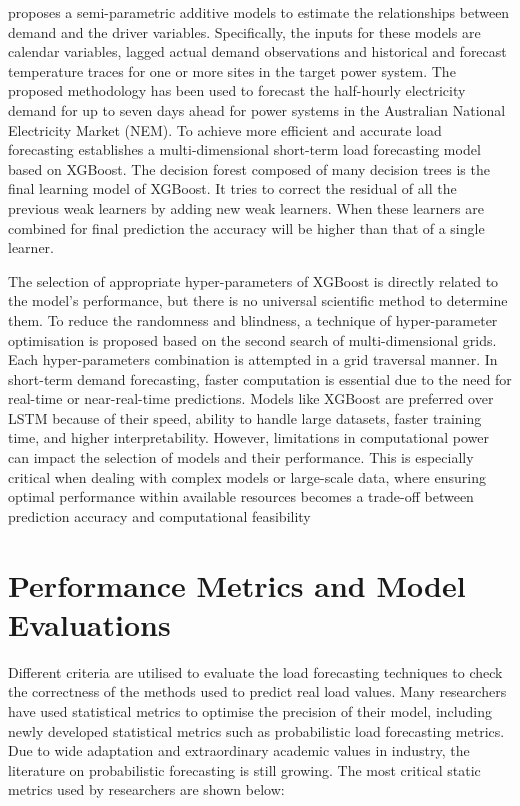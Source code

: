 \documentclass[mstat,12pt]{unswthesis}
\begin{document}
\cite{Fan2012} proposes a semi-parametric additive models to estimate
the relationships between demand and the driver variables. Specifically,
the inputs for these models are calendar variables, lagged actual demand
observations and historical and forecast temperature traces for one or
more sites in the target power system. The proposed methodology has been
used to forecast the half-hourly electricity demand for up to seven days
ahead for power systems in the Australian National Electricity Market
(NEM). To achieve more efficient and accurate load forecasting
\cite{Suo} establishes a multi-dimensional short-term load forecasting
model based on XGBoost. The decision forest composed of many decision
trees is the final learning model of XGBoost. It tries to correct the
residual of all the previous weak learners by adding new weak learners.
When these learners are combined for final prediction the accuracy will
be higher than that of a single learner.

The selection of appropriate hyper-parameters of XGBoost is directly
related to the model's performance, but there is no universal scientific
method to determine them. To reduce the randomness and blindness, a
technique of hyper-parameter optimisation is proposed based on the
second search of multi-dimensional grids. Each hyper-parameters
combination is attempted in a grid traversal manner. In short-term
demand forecasting, faster computation is essential due to the need for
real-time or near-real-time predictions. Models like XGBoost are
preferred over LSTM because of their speed, ability to handle large
datasets, faster training time, and higher interpretability. However,
limitations in computational power can impact the selection of models
and their performance. This is especially critical when dealing with
complex models or large-scale data, where ensuring optimal performance
within available resources becomes a trade-off between prediction
accuracy and computational feasibility

\hypertarget{performance-metrics-and-model-evaluations}{%
\section{Performance Metrics and Model
Evaluations}\label{performance-metrics-and-model-evaluations}}

Different criteria are utilised to evaluate the load forecasting
techniques to check the correctness of the methods used to predict real
load values. Many researchers have used statistical metrics to optimise
the precision of their model, including newly developed statistical
metrics such as probabilistic load forecasting metrics. Due to wide
adaptation and extraordinary academic values in industry, the literature
on probabilistic forecasting is still growing. The most critical static
metrics used by researchers are shown below:
\end{document}
